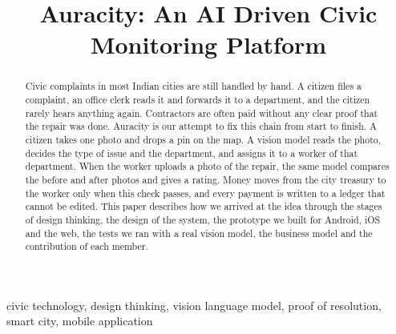 \documentclass[conference,a4paper]{IEEEtran}
\begin{document}
\title{Auracity: An AI Driven Civic Monitoring Platform}
\author{
\and
{}\and
{}\and
{}\and
{}\and
{}
}
\maketitle

\begin{abstract}
Civic complaints in most Indian cities are still handled by hand. A citizen files a complaint, an office clerk reads it and forwards it to a department, and the citizen rarely hears anything again. Contractors are often paid without any clear proof that the repair was done. Auracity is our attempt to fix this chain from start to finish. A citizen takes one photo and drops a pin on the map. A vision model reads the photo, decides the type of issue and the department, and assigns it to a worker of that department. When the worker uploads a photo of the repair, the same model compares the before and after photos and gives a rating. Money moves from the city treasury to the worker only when this check passes, and every payment is written to a ledger that cannot be edited. This paper describes how we arrived at the idea through the stages of design thinking, the design of the system, the prototype we built for Android, iOS and the web, the tests we ran with a real vision model, the business model and the contribution of each member.
\end{abstract}
\begin{IEEEkeywords}
civic technology, design thinking, vision language model, proof of resolution, smart city, mobile application
\end{IEEEkeywords}
\end{document}
